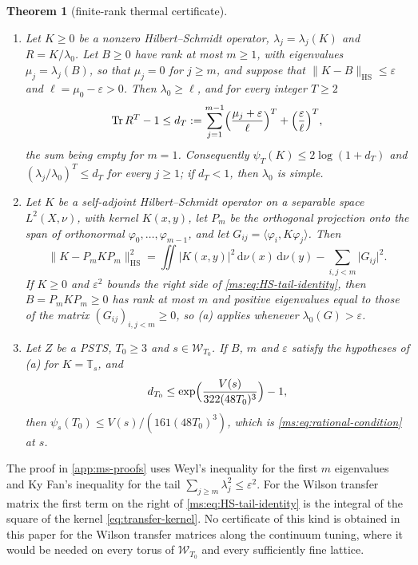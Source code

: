 \documentclass[11pt,a4paper]{amsart}
\newtheorem{theorem}{Theorem}[section]
\theoremstyle{definition}
\theoremstyle{remark}
\numberwithin{equation}{section}
\DeclareMathOperator{\Tr}{Tr}        %
\newcommand{\Wwin}{\mathcal{W}}      %
\newcommand{\ip}[2]{\langle #1,#2\rangle}  %
\newcommand{\norm}[1]{\lVert #1\rVert}     %
\newcommand{\abs}[1]{\lvert #1\rvert}      %
\newcommand{\dd}{\,\mathrm{d}}             %
\newcommand{\PSTS}{\textup{PSTS}}          %
\newcommand{\TT}{\mathbb{T}}               %
\newcommand{\psiT}[2]{\psi_{#1}(#2)}       %
\newcommand{\Vol}[1]{V(#1)}                %
\begin{document}
\begin{theorem}[finite-rank thermal certificate]\label{ms:thm:finite-rank}
\leavevmode
\begin{enumerate}[label=(\alph*)]
\item Let $K\ge0$ be a nonzero Hilbert--Schmidt operator, $\lambda_j=\lambda_j(K)$ and $R=K/\lambda_0$. Let $B\ge0$ have rank at most $m\ge1$, with eigenvalues $\mu_j=\lambda_j(B)$, so that $\mu_j=0$ for $j\ge m$, and suppose that $\norm{K-B}_{\mathrm{HS}}\le\varepsilon$ and $\ell=\mu_0-\varepsilon>0$. Then $\lambda_0\ge\ell$, and for every integer $T\ge2$
\[
\Tr R^T-1\le d_T:=\sum_{j=1}^{m-1}\Bigl(\frac{\mu_j+\varepsilon}{\ell}\Bigr)^T+\Bigl(\frac{\varepsilon}{\ell}\Bigr)^T,
\]
the sum being empty for $m=1$. Consequently $\psi_T(K)\le2\log(1+d_T)$ and $(\lambda_j/\lambda_0)^T\le d_T$ for every $j\ge1$; if $d_T<1$, then $\lambda_0$ is simple.
\item Let $K$ be a self-adjoint Hilbert--Schmidt operator on a separable space $L^2(X,\nu)$, with kernel $K(x,y)$, let $P_m$ be the orthogonal projection onto the span of orthonormal $\varphi_0,\dots,\varphi_{m-1}$, and let $G_{ij}=\ip{\varphi_i}{K\varphi_j}$. Then
\begin{equation}\label{ms:eq:HS-tail-identity}
\norm{K-P_mKP_m}_{\mathrm{HS}}^2=\iint\abs{K(x,y)}^2\dd\nu(x)\dd\nu(y)-\sum_{i,j<m}\abs{G_{ij}}^2 .
\end{equation}
If $K\ge0$ and $\varepsilon^2$ bounds the right side of \eqref{ms:eq:HS-tail-identity}, then $B=P_mKP_m\ge0$ has rank at most $m$ and positive eigenvalues equal to those of the matrix $(G_{ij})_{i,j<m}\ge0$, so (a) applies whenever $\lambda_0(G)>\varepsilon$.
\item Let $Z$ be a \PSTS{}, $T_0\ge3$ and $s\in\Wwin_{T_0}$. If $B$, $m$ and $\varepsilon$ satisfy the hypotheses of (a) for $K=\TT_s$, and
\begin{equation}\label{ms:eq:finite-rank-seed}
d_{T_0}\le\exp\Bigl(\frac{\Vol{s}}{322(48T_0)^3}\Bigr)-1,
\end{equation}
then $\psiT{s}{T_0}\le\Vol{s}/(161(48T_0)^3)$, which is \eqref{ms:eq:rational-condition} at $s$.
\end{enumerate}
\end{theorem}

The proof in \cref{app:ms-proofs} uses Weyl's inequality for the first $m$ eigenvalues and Ky Fan's inequality for the tail $\sum_{j\ge m}\lambda_j^2\le\varepsilon^2$. For the Wilson transfer matrix the first term on the right of \eqref{ms:eq:HS-tail-identity} is the integral of the square of the kernel \eqref{eq:transfer-kernel}. No certificate of this kind is obtained in this paper for the Wilson transfer matrices along the continuum tuning, where it would be needed on every torus of $\Wwin_{T_0}$ and every sufficiently fine lattice.
\end{document}
